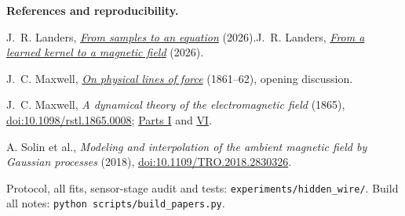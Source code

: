 \documentclass[11pt,letterpaper]{article}
\begin{document}
\vfill
{\footnotesize\raggedright
\textbf{References and reproducibility.}\par
[1] J.~R. Landers, \href{../01-kernel-to-equation/kernel_to_equation.pdf}{\emph{From samples to an equation}}
(2026).\quad
[2] J.~R. Landers, \href{../02-kernel-to-magnetostatics/kernel_to_magnetostatics.pdf}{\emph{From a learned kernel to a magnetic field}}
(2026).\par
[3] J.~C. Maxwell, \href{https://en.wikisource.org/wiki/On_Physical_Lines_of_Force}{\emph{On physical lines of force}}
(1861--62), opening discussion.\par
[4] J.~C. Maxwell, \emph{A dynamical theory of the electromagnetic field} (1865),
\href{https://doi.org/10.1098/rstl.1865.0008}{doi:10.1098/rstl.1865.0008};
\href{https://en.wikisource.org/wiki/A_Dynamical_Theory_of_the_Electromagnetic_Field/Part_I}{Parts I}
and \href{https://en.wikisource.org/wiki/A_Dynamical_Theory_of_the_Electromagnetic_Field/Part_VI}{VI}.\par
[5] A. Solin et al., \emph{Modeling and interpolation of the ambient magnetic field
by Gaussian processes} (2018),
\href{https://doi.org/10.1109/TRO.2018.2830326}{doi:10.1109/TRO.2018.2830326}.\par
Protocol, all fits, sensor-stage audit and tests: \texttt{experiments/hidden\_wire/}.
Build all notes: \texttt{python scripts/build\_papers.py}.\par}
\end{document}

